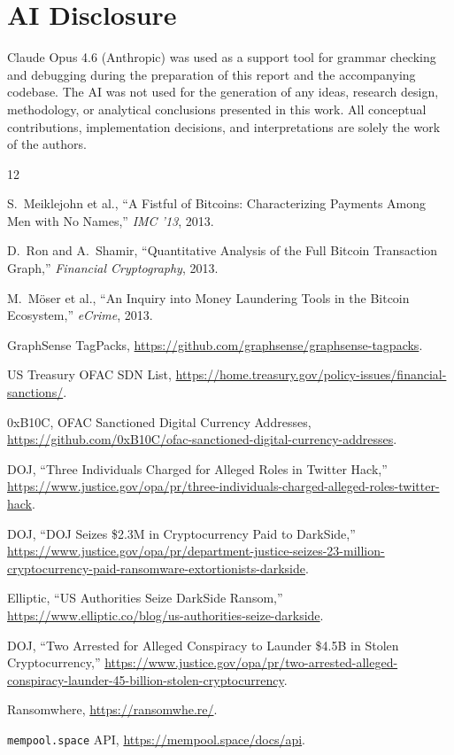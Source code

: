 \documentclass[a4paper,11pt]{article}
\begin{document}
\section*{AI Disclosure}

Claude Opus 4.6 (Anthropic) was used as a support tool for grammar checking and debugging during the preparation of this report and the accompanying codebase.
The AI was not used for the generation of any ideas, research design, methodology, or analytical conclusions presented in this work.
All conceptual contributions, implementation decisions, and interpretations are solely the work of the authors.

\begin{thebibliography}{12}

S.~Meiklejohn et al., ``A Fistful of Bitcoins: Characterizing Payments Among Men with No Names,'' \textit{IMC '13}, 2013.

D.~Ron and A.~Shamir, ``Quantitative Analysis of the Full Bitcoin Transaction Graph,'' \textit{Financial Cryptography}, 2013.

M.~M\"{o}ser et al., ``An Inquiry into Money Laundering Tools in the Bitcoin Ecosystem,'' \textit{eCrime}, 2013.

GraphSense TagPacks, \url{https://github.com/graphsense/graphsense-tagpacks}.

US Treasury OFAC SDN List, \url{https://home.treasury.gov/policy-issues/financial-sanctions/}.

0xB10C, OFAC Sanctioned Digital Currency Addresses, \url{https://github.com/0xB10C/ofac-sanctioned-digital-currency-addresses}.

DOJ, ``Three Individuals Charged for Alleged Roles in Twitter Hack,'' \url{https://www.justice.gov/opa/pr/three-individuals-charged-alleged-roles-twitter-hack}.

DOJ, ``DOJ Seizes \$2.3M in Cryptocurrency Paid to DarkSide,'' \url{https://www.justice.gov/opa/pr/department-justice-seizes-23-million-cryptocurrency-paid-ransomware-extortionists-darkside}.

Elliptic, ``US Authorities Seize DarkSide Ransom,'' \url{https://www.elliptic.co/blog/us-authorities-seize-darkside}.

DOJ, ``Two Arrested for Alleged Conspiracy to Launder \$4.5B in Stolen Cryptocurrency,'' \url{https://www.justice.gov/opa/pr/two-arrested-alleged-conspiracy-launder-45-billion-stolen-cryptocurrency}.

Ransomwhere, \url{https://ransomwhe.re/}.

\texttt{mempool.space} API, \url{https://mempool.space/docs/api}.

\end{thebibliography}
\end{document}
